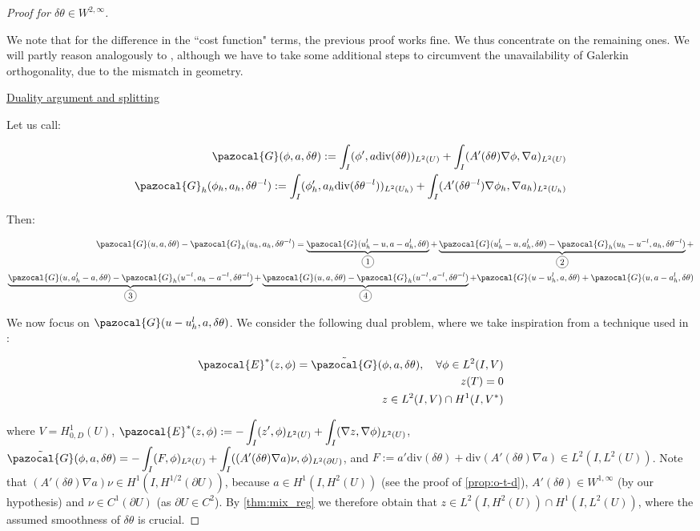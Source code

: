 \documentclass[english,a4paper,9pt,oneside]{scrbook}	%
\theoremstyle{break}
\newenvironment{mproof}[1][\proofname]{%
  \begin{proof}[#1]$ $\par\nobreak\ignorespaces
}{%
  \end{proof}
}
\renewcommand*{\proofname}{Proof}
\theoremstyle{remark}
\newcommand{\ds}{\displaystyle}
\newcommand{\te}{\theta}
\newcommand{\dive}{\text{div}}
\newcommand*\circled[1]{\tikz[baseline=(char.base)]{
            \node[shape=circle,draw,inner sep=2pt] (char) {#1};}}
\newcommand{\mE}{\pazocal{E}}
\newcommand{\mG}{\pazocal{G}}
\begin{document}
\begin{mproof}[Proof for $\delta \te \in W^{2,\infty}$]

We note that for the difference in the ``cost function" terms, the previous proof works fine. We thus concentrate on the remaining ones. We will partly reason analogously to \cite{paganini}, although we have to take some additional steps to circumvent the unavailability of Galerkin orthogonality, due to the mismatch in geometry.

\underline{Duality argument and splitting}

Let us call: 

\begin{align*}
\mG(\phi,a, \delta \te):=\ds \int_I(\phi',a\dive(\delta \te))_{L^2(U)} + \int_I (A'(\delta\te )\nabla \phi, \nabla a)_{L^2(U)}\\
\mG_h(\phi_h,a_h, \delta \te^{-l}):=\ds \int_I (\phi_h',a_h\dive(\delta \te^{-l}))_{L^2(U_h)} + \int_I (A'(\delta \te^{-l})\nabla \phi_h, \nabla a_h)_{L^2(U_h)}
\end{align*}

Then:

\begin{align*}
	\mG(u,a, \delta \te) - \mG_h(u_h,a_h, \delta \te^{-l}) =
	\underbrace{\mG(u_h^l-u, a-a_h^l, \delta \te)}_{\circled{1}}+
	\underbrace{\mG(u_h^l-u,a_h^l, \delta \te) - \mG_h(u_h-u^{-l},a_h,\delta \te^{-l})}_{\circled{2}}+\\
	\underbrace{\mG(u,a_h^l-a,\delta \te) - \mG_h(u^{-l}, a_h - a^{-l}, \delta \te^{-l})}_{\circled{3}}+
	\underbrace{\mG(u,a,\delta \te) - \mG_h(u^{-l},a^{-l},\delta \te^{-l})}_{\circled{4}} +
	\mG(u-u_h^l, a, \delta \te)+	\mG(u, a-a_h^l,\delta \te)
\end{align*}

We now focus on $\mG(u-u_h^l, a, \delta \te)$. We consider the following dual problem, where we take inspiration from a technique used in \cite{paganini}:

\begin{align}
\label{eqn:dual_problem}
	\mE^*(z,\phi) = \tilde{\mG}(\phi, a, \delta \te), \quad \forall \phi \in L^2(I,V)\\
	z(T) = 0 \\
	z \in L^2(I,V)\cap H^1(I,V^*)
\end{align}

where $V = H^1_{0,D}(U)$, $\mE^*(z,\phi) := -\ds \int_I(z',\phi)_{L^2(U)} + \int_I (\nabla z, \nabla \phi)_{L^2(U)}$, $\tilde{\mG}(\phi, a, \delta \te) =  \ds -\int_I(F, \phi)_{L^2(U)} + \int_I((A'(\delta \te) \nabla a)\nu, \phi)_{L^2(\partial U)}$, and $F:=a'\dive(\delta \te) + \dive(A'(\delta \te) \nabla a )\in L^2(I,L^2(U))$.
Note that $(A'(\delta \te) \nabla a)\nu \in H^1(I,H^{1/2}(\partial U))$, because $a \in H^1(I,H^2(U))$ (see the proof of \cref{prop:o-t-d}), $A'(\delta \te) \in W^{1,\infty}$ (by our hypothesis) and $\nu \in C^1(\partial U)$ (as $\partial U \in C^2$). By \cref{thm:mix_reg} we therefore obtain that $z \in L^2(I,H^2(U)) \cap H^1(I,L^2(U))$, where the assumed smoothness of $\delta \te$ is crucial.


\end{mproof}
\end{document}
